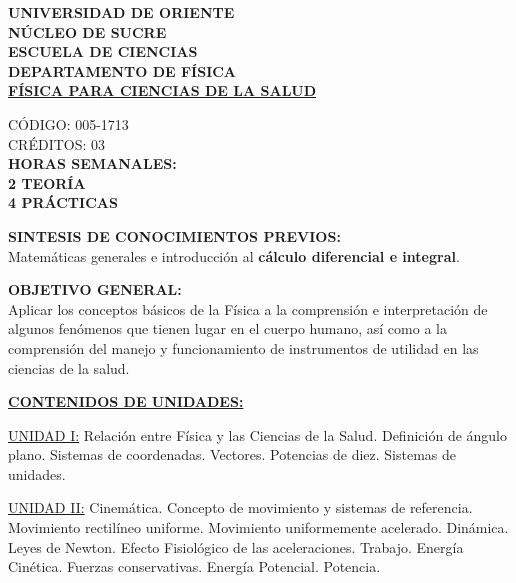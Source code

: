 \documentclass[12pt,letterpaper]{article}
\begin{document}
\begin{center}
    \textbf{UNIVERSIDAD DE ORIENTE}\\
    \textbf{NÚCLEO DE SUCRE}\\
    \textbf{ESCUELA DE CIENCIAS}\\
    \textbf{DEPARTAMENTO DE FÍSICA}\\
    \vspace{0.5cm}
    {\Large \textbf{\uline{FÍSICA PARA CIENCIAS DE LA SALUD}}}\\
\end{center}

\vspace{0.5cm}
\begin{flushright}
    CÓDIGO: 005-1713\\
    CRÉDITOS: 03\\
    \textbf{HORAS SEMANALES:}\\
    \textbf{2 TEORÍA}\\
    \textbf{4 PRÁCTICAS}
\end{flushright}

\vspace{0.5cm}

\noindent \textbf{SINTESIS DE CONOCIMIENTOS PREVIOS:}\\
Matemáticas generales e introducción al \textbf{cálculo diferencial e integral}.

\vspace{0.5cm}
\noindent \textbf{OBJETIVO GENERAL:}\\
Aplicar los conceptos básicos de la Física a la comprensión e interpretación de algunos fenómenos que tienen lugar en el cuerpo humano, así como a la comprensión del manejo y funcionamiento de instrumentos de utilidad en las ciencias de la salud.

\vspace{0.5cm}
\noindent \textbf{\uline{CONTENIDOS DE UNIDADES:}}

\vspace{0.3cm}
\noindent \uline{UNIDAD I:} Relación entre Física y las Ciencias de la Salud. Definición de ángulo plano. Sistemas de coordenadas. Vectores. Potencias de diez. Sistemas de unidades.

\vspace{0.3cm}
\noindent \uline{UNIDAD II:} Cinemática. Concepto de movimiento y sistemas de referencia. Movimiento rectilíneo uniforme. Movimiento uniformemente acelerado. Dinámica. Leyes de Newton. Efecto Fisiológico de las aceleraciones. Trabajo. Energía Cinética. Fuerzas conservativas. Energía Potencial. Potencia. 
\end{document}
